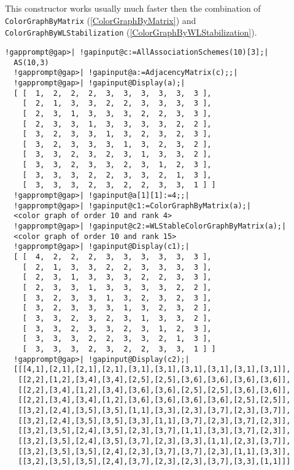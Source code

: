 \documentclass[a4paper,11pt]{report}
\begin{document}
{{{ This constructor works usually much faster then the combination of \texttt{ColorGraphByMatrix} (\ref{ColorGraphByMatrix}) and \texttt{ColorGraphByWLStabilization} (\ref{ColorGraphByWLStabilization}). 
\begin{Verbatim}[commandchars=!@|,fontsize=\small,frame=single,label=Example]
  !gapprompt@gap>| !gapinput@c:=AllAssociationSchemes(10)[3];|
  AS(10,3)
  !gapprompt@gap>| !gapinput@a:=AdjacencyMatrix(c);;|
  !gapprompt@gap>| !gapinput@Display(a);|
  [ [  1,  2,  2,  2,  3,  3,  3,  3,  3,  3 ],
    [  2,  1,  3,  3,  2,  2,  3,  3,  3,  3 ],
    [  2,  3,  1,  3,  3,  3,  2,  2,  3,  3 ],
    [  2,  3,  3,  1,  3,  3,  3,  3,  2,  2 ],
    [  3,  2,  3,  3,  1,  3,  2,  3,  2,  3 ],
    [  3,  2,  3,  3,  3,  1,  3,  2,  3,  2 ],
    [  3,  3,  2,  3,  2,  3,  1,  3,  3,  2 ],
    [  3,  3,  2,  3,  3,  2,  3,  1,  2,  3 ],
    [  3,  3,  3,  2,  2,  3,  3,  2,  1,  3 ],
    [  3,  3,  3,  2,  3,  2,  2,  3,  3,  1 ] ]
  !gapprompt@gap>| !gapinput@a[1][1]:=4;;|
  !gapprompt@gap>| !gapinput@c1:=ColorGraphByMatrix(a);|
  <color graph of order 10 and rank 4>
  !gapprompt@gap>| !gapinput@c2:=WLStableColorGraphByMatrix(a);|
  <color graph of order 10 and rank 15>
  !gapprompt@gap>| !gapinput@Display(c1);|
  [ [  4,  2,  2,  2,  3,  3,  3,  3,  3,  3 ],
    [  2,  1,  3,  3,  2,  2,  3,  3,  3,  3 ],
    [  2,  3,  1,  3,  3,  3,  2,  2,  3,  3 ],
    [  2,  3,  3,  1,  3,  3,  3,  3,  2,  2 ],
    [  3,  2,  3,  3,  1,  3,  2,  3,  2,  3 ],
    [  3,  2,  3,  3,  3,  1,  3,  2,  3,  2 ],
    [  3,  3,  2,  3,  2,  3,  1,  3,  3,  2 ],
    [  3,  3,  2,  3,  3,  2,  3,  1,  2,  3 ],
    [  3,  3,  3,  2,  2,  3,  3,  2,  1,  3 ],
    [  3,  3,  3,  2,  3,  2,  2,  3,  3,  1 ] ]
  !gapprompt@gap>| !gapinput@Display(c2);|
  [[[4,1],[2,1],[2,1],[2,1],[3,1],[3,1],[3,1],[3,1],[3,1],[3,1]],
   [[2,2],[1,2],[3,4],[3,4],[2,5],[2,5],[3,6],[3,6],[3,6],[3,6]],
   [[2,2],[3,4],[1,2],[3,4],[3,6],[3,6],[2,5],[2,5],[3,6],[3,6]],
   [[2,2],[3,4],[3,4],[1,2],[3,6],[3,6],[3,6],[3,6],[2,5],[2,5]],
   [[3,2],[2,4],[3,5],[3,5],[1,1],[3,3],[2,3],[3,7],[2,3],[3,7]],
   [[3,2],[2,4],[3,5],[3,5],[3,3],[1,1],[3,7],[2,3],[3,7],[2,3]],
   [[3,2],[3,5],[2,4],[3,5],[2,3],[3,7],[1,1],[3,3],[3,7],[2,3]],
   [[3,2],[3,5],[2,4],[3,5],[3,7],[2,3],[3,3],[1,1],[2,3],[3,7]],
   [[3,2],[3,5],[3,5],[2,4],[2,3],[3,7],[3,7],[2,3],[1,1],[3,3]],
   [[3,2],[3,5],[3,5],[2,4],[3,7],[2,3],[2,3],[3,7],[3,3],[1,1]]]
  	    
\end{Verbatim}
 }

 

}}
\end{document}
